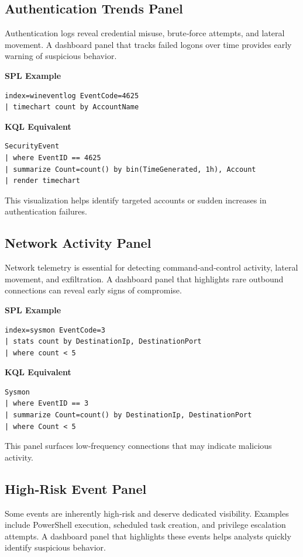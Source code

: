 \subsection*{Authentication Trends Panel}

Authentication logs reveal credential misuse, brute‑force attempts, and lateral movement. A dashboard panel that tracks failed logons over time provides early warning of suspicious behavior.

\textbf{SPL Example}
\begin{lstlisting}
index=wineventlog EventCode=4625
| timechart count by AccountName
\end{lstlisting}

\textbf{KQL Equivalent}
\begin{lstlisting}
SecurityEvent
| where EventID == 4625
| summarize Count=count() by bin(TimeGenerated, 1h), Account
| render timechart
\end{lstlisting}

This visualization helps identify targeted accounts or sudden increases in authentication failures.

\subsection*{Network Activity Panel}

Network telemetry is essential for detecting command‑and‑control activity, lateral movement, and exfiltration. A dashboard panel that highlights rare outbound connections can reveal early signs of compromise.

\textbf{SPL Example}
\begin{lstlisting}
index=sysmon EventCode=3
| stats count by DestinationIp, DestinationPort
| where count < 5
\end{lstlisting}

\textbf{KQL Equivalent}
\begin{lstlisting}
Sysmon
| where EventID == 3
| summarize Count=count() by DestinationIp, DestinationPort
| where Count < 5
\end{lstlisting}

This panel surfaces low‑frequency connections that may indicate malicious activity.

\subsection*{High‑Risk Event Panel}

Some events are inherently high‑risk and deserve dedicated visibility. Examples include PowerShell execution, scheduled task creation, and privilege escalation attempts. A dashboard panel that highlights these events helps analysts quickly identify suspicious behavior.

